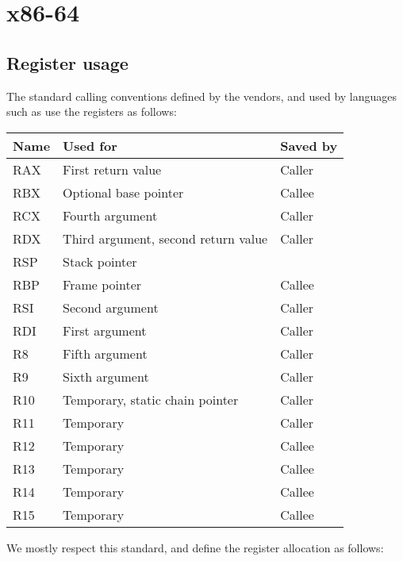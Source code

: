\chapter{x86-64}
\label{chapter-backend-x86-64}

\section{Register usage}

The standard calling conventions defined by the vendors, and used by
languages such as \clanguage{} use the registers as follows:

\begin{tabular}{|l|l|l|}
\hline
Name & Used for & Saved by\\
\hline
\hline
RAX & First return value & Caller\\
RBX & Optional base pointer & Callee\\
RCX & Fourth argument & Caller \\
RDX & Third argument, second return value & Caller\\
RSP & Stack pointer &\\
RBP & Frame pointer & Callee\\
RSI & Second argument & Caller\\
RDI & First argument & Caller\\
R8 & Fifth argument & Caller\\
R9 & Sixth argument & Caller\\
R10 & Temporary, static chain pointer & Caller\\
R11 & Temporary & Caller\\
R12 & Temporary & Callee\\
R13 & Temporary & Callee\\
R14 & Temporary & Callee\\
R15 & Temporary & Callee\\
\hline
\end{tabular}

We mostly respect this standard, and define the register allocation as
follows:

